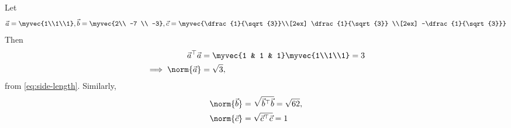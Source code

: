 Let 
\begin{align}
	\vec{a} = \myvec{1\\1\\1} , \vec{b} = \myvec{2\\ -7 \\ -3}, 
\vec{c} = \myvec{\dfrac{1}{\sqrt{3}}\\[2ex] \dfrac{1}{\sqrt{3}} \\[2ex] -\dfrac{1}{\sqrt{3}}} 
\label{eq:chapters/12/10/2/1/1}
\end{align}
Then
\begin{align}
	{\vec{a}^{\top}\vec{a}} &= \myvec{1  &  1  &  1}\myvec{1\\1\\1} = 3
\\
\implies 
	\norm{\vec{a}}&=\sqrt{3}, 
	\label{eq:chapters/12/10/2/1/3}
\end{align}
		from \eqref{eq:side-length}. Similarly,
\begin{align}
	\norm{\vec{b}}&=\sqrt{\vec{b}^{\top}\vec{b}}= \sqrt{62}, 
	\label{eq:chapters/12/10/2/1/4}
	\\ \norm{\vec{c}}&=\sqrt{\vec{c}^{\top}\vec{c}}	
=1
	\label{eq:chapters/12/10/2/1/5}
\end{align}



